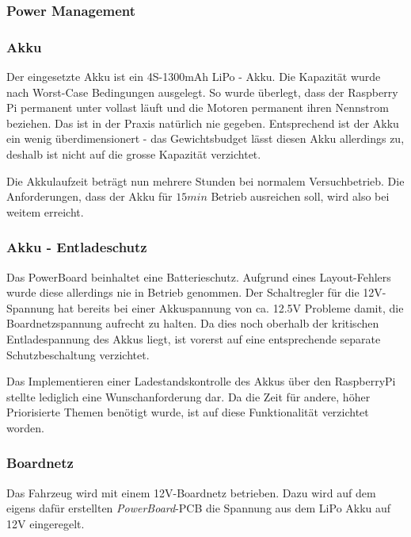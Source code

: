 \documentclass[main.tex]{subfiles} %
\begin{document}

\subsubsection{Power Management}

\subsubsection*{Akku}

Der eingesetzte Akku ist ein 4S-1300mAh LiPo - Akku. Die Kapazität wurde nach
Worst-Case Bedingungen ausgelegt. So wurde überlegt, dass der Raspberry Pi
permanent unter vollast läuft und die Motoren permanent ihren Nennstrom
beziehen. Das ist in der Praxis natürlich nie gegeben. Entsprechend ist der
Akku ein wenig überdimensionert - das Gewichtsbudget lässt diesen Akku
allerdings zu, deshalb ist nicht auf die grosse Kapazität verzichtet.


Die Akkulaufzeit beträgt nun mehrere Stunden bei normalem Versuchbetrieb. Die Anforderungen, 
dass der Akku für $15min$ Betrieb ausreichen soll, wird also bei weitem erreicht. 

\subsubsection*{Akku - Entladeschutz}

Das PowerBoard beinhaltet eine Batterieschutz. Aufgrund eines Layout-Fehlers
wurde diese allerdings nie in Betrieb genommen. Der Schaltregler für die
12V-Spannung hat bereits bei einer Akkuspannung von ca. 12.5V Probleme damit,
die Boardnetzspannung aufrecht zu halten. Da dies noch oberhalb der kritischen
Entladespannung des Akkus liegt, ist vorerst auf eine entsprechende separate
Schutzbeschaltung verzichtet.

Das Implementieren einer Ladestandskontrolle des Akkus über den RaspberryPi
stellte lediglich eine Wunschanforderung dar. Da die Zeit für andere, höher
Priorisierte Themen benötigt wurde, ist auf diese Funktionalität verzichtet
worden.

\subsubsection*{Boardnetz}

Das Fahrzeug wird mit einem 12V-Boardnetz betrieben. Dazu wird auf dem eigens
dafür erstellten \textit{PowerBoard}-PCB die Spannung aus dem LiPo Akku auf 12V
eingeregelt.
\end{document}
